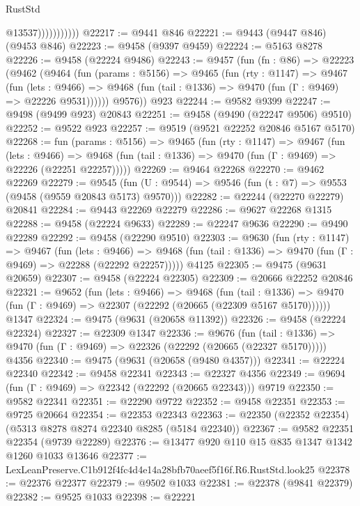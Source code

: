 \begin{lexlean}{RustStd}
\begin{coremodule}
                          @13537)))))))))))
@22217 := @9441 @846
@22221 := @9443 (@9447 @846) (@9453 @846)
@22223 := @9458 (@9397 @9459)
@22224 := @5163 @8278
@22226 := @9458 (@22224 @9486)
@22243 := @9457
    (fun (fn : @86) =>
    @22223
      (@9462
        (@9464
          (fun (params : @5156) =>
          @9465
            (fun (rty : @1147) =>
            @9467
              (fun (lets : @9466) =>
              @9468 (fun (tail : @1336) => @9470 (fun (Γ : @9469) => @22226 @9531))))))
        @9576))
    @923
@22244 := @9582 @9399
@22247 := @9498 (@9499 @923) @20843
@22251 := @9458 (@9490 (@22247 @9506) @9510)
@22252 := @9522 @923
@22257 := @9519 (@9521 @22252 @20846 @5167 @5170)
@22268 := fun (params : @5156) =>
  @9465
    (fun (rty : @1147) =>
    @9467
      (fun (lets : @9466) =>
      @9468 (fun (tail : @1336) => @9470 (fun (Γ : @9469) => @22226 (@22251 @22257)))))
@22269 := @9464 @22268
@22270 := @9462 @22269
@22279 := @9545
    (fun (U : @9544) => @9546 (fun (t : @7) => @9553 (@9458 (@9559 @20843 @5173) @9570)))
@22282 := @22244 (@22270 @22279) @20841
@22284 := @9443 @22269 @22279
@22286 := @9627 @22268 @1315
@22288 := @9458 (@22224 @9633)
@22289 := @22247 @9636
@22290 := @9490 @22289
@22292 := @9458 (@22290 @9510)
@22303 := @9630
    (fun (rty : @1147) =>
    @9467
      (fun (lets : @9466) =>
      @9468 (fun (tail : @1336) => @9470 (fun (Γ : @9469) => @22288 (@22292 @22257)))))
    @4125
@22305 := @9475 (@9631 @20659)
@22307 := @9458 (@22224 @22305)
@22309 := @20666 @22252 @20846
@22321 := @9652
    (fun (lets : @9466) =>
    @9468
      (fun (tail : @1336) =>
      @9470 (fun (Γ : @9469) => @22307 (@22292 (@20665 (@22309 @5167 @5170))))))
    @1347
@22324 := @9475 (@9631 (@20658 @11392))
@22326 := @9458 (@22224 @22324)
@22327 := @22309 @1347
@22336 := @9676
    (fun (tail : @1336) => @9470 (fun (Γ : @9469) => @22326 (@22292 (@20665 (@22327 @5170)))))
    @4356
@22340 := @9475 (@9631 (@20658 (@9480 @4357)))
@22341 := @22224 @22340
@22342 := @9458 @22341
@22343 := @22327 @4356
@22349 := @9694 (fun (Γ : @9469) => @22342 (@22292 (@20665 @22343))) @9719
@22350 := @9582 @22341
@22351 := @22290 @9722
@22352 := @9458 @22351
@22353 := @9725 @20664
@22354 := @22353 @22343
@22363 := @22350 (@22352 @22354) (@5313 @8278 @8274 @22340 @8285 (@5184 @22340))
@22367 := @9582 @22351 @22354 (@9739 @22289)
@22376 := @13477 @920 @110 @15 @835 @1347 @1342 @1260 @1033 @13646
@22377 := LexLeanPreserve.C1b912f4fc4d4e14a28bfb70aeef5f16f.R6.RustStd.look25
@22378 := @22376 @22377
@22379 := @9502 @1033
@22381 := @22378 (@9841 @22379)
@22382 := @9525 @1033
@22398 := @22221

\end{coremodule}
\end{lexlean}
